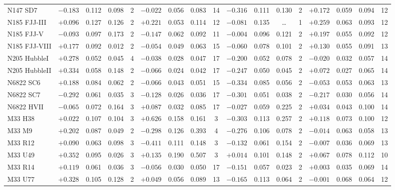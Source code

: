 \documentclass{aa}
\begin{document}
\begin{appendix}
\begin{table*}
\begin{adjustbox}{width=1\textwidth}
{\begin{tabular}{l cccccccccccccccc}
N147 SD7      & $-0.183$ & 0.112 & 0.098 & 2 & $-0.022$ & 0.056 & 0.083 & 14 & $-0.316$ & 0.111 & 0.130 & 2 & $+0.172$ & 0.059 & 0.094 & 12 \\
N185 FJJ-III  & $+0.096$ & 0.127 & 0.126 & 2 & $+0.221$ & 0.053 & 0.114 & 12 & $-0.081$ & 0.135 & \ldots & 1 & $+0.259$ & 0.063 & 0.093 & 12 \\
N185 FJJ-V    & $-0.093$ & 0.097 & 0.173 & 2 & $-0.147$ & 0.062 & 0.092 & 11 & $-0.004$ & 0.096 & 0.121 & 2 & $+0.197$ & 0.055 & 0.092 & 12 \\
N185 FJJ-VIII & $+0.177$ & 0.092 & 0.012 & 2 & $-0.054$ & 0.049 & 0.063 & 15 & $-0.060$ & 0.078 & 0.101 & 2 & $+0.130$ & 0.055 & 0.091 & 13 \\
N205 HubbleI  & $+0.278$ & 0.052 & 0.045 & 4 & $-0.038$ & 0.028 & 0.047 & 17 & $-0.200$ & 0.052 & 0.078 & 2 & $-0.020$ & 0.032 & 0.057 & 14 \\
N205 HubbleII & $+0.334$ & 0.058 & 0.148 & 2 & $-0.066$ & 0.024 & 0.042 & 17 & $-0.247$ & 0.050 & 0.045 & 2 & $+0.072$ & 0.027 & 0.065 & 14 \\
N6822 SC6     & $+0.188$ & 0.084 & 0.062 & 2 & $-0.066$ & 0.043 & 0.051 & 15 & $-0.334$ & 0.085 & 0.056 & 2 & $-0.053$ & 0.053 & 0.063 & 13 \\
N6822 SC7     & $-0.292$ & 0.061 & 0.035 & 3 & $-0.128$ & 0.026 & 0.036 & 17 & $-0.301$ & 0.051 & 0.038 & 2 & $-0.217$ & 0.030 & 0.056 & 14 \\
N6822 HVII    & $-0.065$ & 0.072 & 0.164 & 3 & $+0.087$ & 0.032 & 0.085 & 17 & $-0.027$ & 0.059 & 0.225 & 2 & $+0.034$ & 0.043 & 0.100 & 14 \\
M33 H38       & $+0.022$ & 0.107 & 0.104 & 3 & $+0.626$ & 0.158 & 0.161 & 3 & $-0.303$ & 0.113 & 0.257 & 2 & $+0.118$ & 0.073 & 0.100 & 12 \\
M33 M9        & $+0.202$ & 0.087 & 0.049 & 2 & $-0.298$ & 0.126 & 0.393 & 4 & $-0.276$ & 0.106 & 0.078 & 2 & $-0.014$ & 0.063 & 0.058 & 13 \\
M33 R12       & $+0.090$ & 0.063 & 0.098 & 3 & $-0.411$ & 0.111 & 0.148 & 3 & $-0.132$ & 0.061 & 0.154 & 2 & $-0.007$ & 0.036 & 0.069 & 13 \\
M33 U49       & $+0.352$ & 0.095 & 0.026 & 3 & $+0.135$ & 0.190 & 0.507 & 3 & $+0.014$ & 0.101 & 0.148 & 2 & $+0.067$ & 0.078 & 0.112 & 10 \\
M33 R14       & $+0.119$ & 0.061 & 0.036 & 3 & $-0.056$ & 0.030 & 0.050 & 17 & $-0.151$ & 0.057 & 0.023 & 2 & $+0.003$ & 0.035 & 0.069 & 14 \\
M33 U77       & $+0.328$ & 0.105 & 0.128 & 2 & $+0.049$ & 0.056 & 0.089 & 13 & $-0.165$ & 0.113 & 0.064 & 2 & $-0.001$ & 0.068 & 0.064 & 12 \\

\end{tabular}}
\end{adjustbox}
\end{table*}
\end{appendix}
\end{document}
